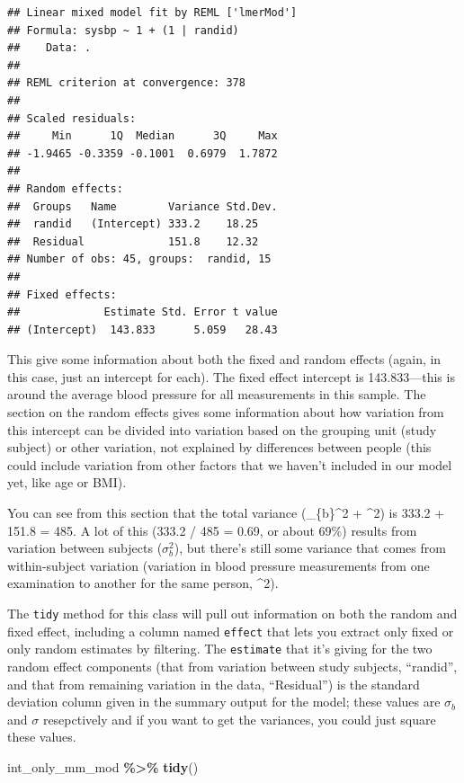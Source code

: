 \documentclass[
]{book}
\newenvironment{Shaded}{\begin{snugshade}}{\end{snugshade}}
\newcommand{\FunctionTok}[1]{\textcolor[rgb]{0.13,0.29,0.53}{\textbf{#1}}}
\newcommand{\NormalTok}[1]{#1}
\newcommand{\SpecialCharTok}[1]{\textcolor[rgb]{0.81,0.36,0.00}{\textbf{#1}}}
\begin{document}
\begin{verbatim}
## Linear mixed model fit by REML ['lmerMod']
## Formula: sysbp ~ 1 + (1 | randid)
##    Data: .
## 
## REML criterion at convergence: 378
## 
## Scaled residuals: 
##     Min      1Q  Median      3Q     Max 
## -1.9465 -0.3359 -0.1001  0.6979  1.7872 
## 
## Random effects:
##  Groups   Name        Variance Std.Dev.
##  randid   (Intercept) 333.2    18.25   
##  Residual             151.8    12.32   
## Number of obs: 45, groups:  randid, 15
## 
## Fixed effects:
##             Estimate Std. Error t value
## (Intercept)  143.833      5.059   28.43
\end{verbatim}

This give some information about both the fixed and random effects (again, in
this case, just an intercept for each). The fixed effect intercept is
143.833---this is around the average blood pressure for all measurements in this
sample. The section on the random effects gives some information about
how variation from this intercept can be divided into variation based on the
grouping unit (study subject) or other variation, not explained by differences
between people (this could include variation from other
factors that we haven't included in our model yet, like age or BMI).

You can see from this section that the total variance (\sigma\_\{b\}\^{}2 + \sigma\^{}2)
is 333.2 + 151.8 = 485. A lot of this (333.2 / 485 = 0.69, or about 69\%) results
from variation between subjects (\(\sigma_{b}^2\)), but there's still some variance
that comes from within-subject variation (variation in blood pressure measurements
from one examination to another for the same person, \sigma\^{}2).

The \texttt{tidy} method for this class will pull out information on both the random
and fixed effect, including a column named \texttt{effect} that lets you extract only
fixed or only random estimates by filtering. The \texttt{estimate} that it's giving for
the two random effect components (that from variation between study subjects,
``randid'', and that from remaining variation in the data, ``Residual'') is the
standard deviation column given in the summary output for the model; these values
are \(\sigma_{b}\) and \(\sigma\) resepctively and if you want to get the variances,
you could just square these values.

\begin{Shaded}
\begin{Highlighting}[]
\NormalTok{int\_only\_mm\_mod }\SpecialCharTok{\%\textgreater{}\%}
  \FunctionTok{tidy}\NormalTok{()}
\end{Highlighting}
\end{Shaded}
\end{document}
